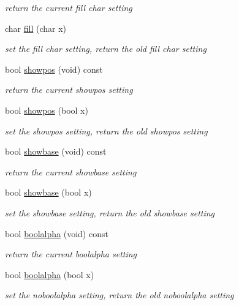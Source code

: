 \begin{DoxyCompactItemize}
\begin{DoxyCompactList}\small\item\em return the current fill char setting \end{DoxyCompactList}\item 
char \hyperlink{classhwlib_1_1ostream_a7d7d3d7d7bd7896c51649a8c9c0a236c}{fill} (char x)
\begin{DoxyCompactList}\small\item\em set the fill char setting, return the old fill char setting \end{DoxyCompactList}\item 
bool \hyperlink{classhwlib_1_1ostream_a5b8e4c021711ab0fbbefcd2df29c03a7}{showpos} (void) const 
\begin{DoxyCompactList}\small\item\em return the current showpos setting \end{DoxyCompactList}\item 
bool \hyperlink{classhwlib_1_1ostream_a63eb8b78e5a4a3250043b4b9ecb35f16}{showpos} (bool x)
\begin{DoxyCompactList}\small\item\em set the showpos setting, return the old showpos setting \end{DoxyCompactList}\item 
bool \hyperlink{classhwlib_1_1ostream_aa47993e8c6771ed093859416133b3724}{showbase} (void) const 
\begin{DoxyCompactList}\small\item\em return the current showbase setting \end{DoxyCompactList}\item 
bool \hyperlink{classhwlib_1_1ostream_ad3290e2669fd1ced136efc657f4478a2}{showbase} (bool x)
\begin{DoxyCompactList}\small\item\em set the showbase setting, return the old showbase setting \end{DoxyCompactList}\item 
bool \hyperlink{classhwlib_1_1ostream_aa4ad6c4c344926b02b165e89bddb98b5}{boolalpha} (void) const 
\begin{DoxyCompactList}\small\item\em return the current boolalpha setting \end{DoxyCompactList}\item 
bool \hyperlink{classhwlib_1_1ostream_a4b94d035da5b074afee5fdef06dcf737}{boolalpha} (bool x)
\begin{DoxyCompactList}\small\item\em set the noboolalpha setting, return the old noboolalpha setting \end{DoxyCompactList}\item 

\end{DoxyCompactItemize}
